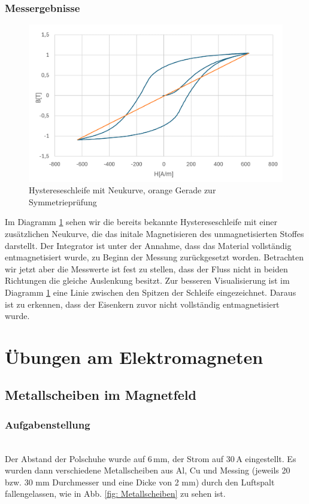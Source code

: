 \documentclass[a4paper,twoside,12pt,DIV=13,BCOR=5mm,numbers=noenddot,cleardoublepage=empty]{scrbook}
\begin{document}
        \subsection{Messergebnisse}
        \begin{figure}
          \centering
          \includegraphics[width=0.9\linewidth]{pictures/Neukurve.png}
          \caption{Hystereseschleife mit Neukurve, orange Gerade zur Symmetriepr\"ufung}
          \label{fig:neukurve}
        \end{figure}
        Im Diagramm \ref{fig:neukurve} sehen wir die bereits bekannte Hystereseschleife mit einer zus\"atzlichen Neukurve, die das initale Magnetisieren des unmagnetisierten Stoffes darstellt.
         Der Integrator ist unter der Annahme, dass das Material vollst\"andig entmagnetisiert wurde, zu Beginn der Messung zur\"uckgesetzt worden. Betrachten wir jetzt aber die Messwerte ist fest zu stellen, dass der Fluss nicht 
         in beiden Richtungen die gleiche Auslenkung besitzt. Zur besseren Visualisierung ist im Diagramm \ref{fig:neukurve} eine Linie zwischen den Spitzen der Schleife eingezeichnet. 
         Daraus ist zu erkennen, dass der Eisenkern zuvor nicht vollst\"andig entmagnetisiert wurde. 
        
\chapter{Übungen am Elektromagneten}
\section{Metallscheiben im Magnetfeld}
\label{Metallscheiben im Magnetfeld}
\subsection{Aufgabenstellung}
\noindent\\
Der Abstand der Polschuhe wurde auf 6\,mm, der Strom auf 30\,A eingestellt.
Es wurden dann verschiedene Metallscheiben aus Al, Cu und Messing (jeweils 20 bzw. 30 mm Durchmesser und eine Dicke von 2 mm) durch den Luftspalt fallengelassen, wie in Abb. \ref{fig: Metallscheiben} zu sehen ist.
\end{document}
